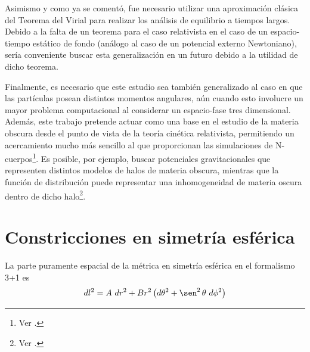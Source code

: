 \documentclass[11pt,twoside,openright,spanish]{report}
\numberwithin{equation}{chapter}
\numberwithin{figure}{chapter}
\numberwithin{table}{chapter}
\renewcommand{\sin}{\operatorname{\sen}}
\begin{document}
Asimismo y como ya se comentó, fue necesario utilizar una aproximación clásica del Teorema del Virial para realizar los análisis de equilibrio a tiempos largos. Debido a la falta de un teorema para el caso relativista en el caso de un espacio-tiempo estático de fondo (análogo al caso de un potencial externo Newtoniano), sería conveniente buscar esta generalización en un futuro debido a la utilidad de dicho teorema.

Finalmente, es necesario que este estudio sea también generalizado al caso en que las partículas posean distintos momentos angulares, aún cuando esto involucre un mayor problema computacional al considerar un espacio-fase tres dimensional. Además, este trabajo pretende actuar como una base en el estudio de la materia obscura desde el punto de vista de la teoría cinética relativista, permitiendo un acercamiento mucho más sencillo al que proporcionan las simulaciones de N-cuerpos\footnote{Ver \citet{Colombi2015}.}. Es posible, por ejemplo, buscar potenciales gravitacionales que representen distintos modelos de halos de materia obscura, mientras que la función de distribución puede representar una inhomogeneidad de materia oscura dentro de dicho halo\footnote{Ver \citet{Dominguez2017}.}.

\clearpage
\appendix 

\fancyhead[LO]{}
\fancyhead[RE]{}
\pagestyle{fancy}

\chapter{Constricciones en simetría esférica}\label{desarrolloconstadm}
La parte puramente espacial de la métrica en simetría esférica en el formalismo 3+1 es
\begin{equation}
dl^2=A\ dr^2+Br^2\left(d\theta^2+\sin^2\theta\ d\phi^2\right)
\end{equation}
\end{document}
